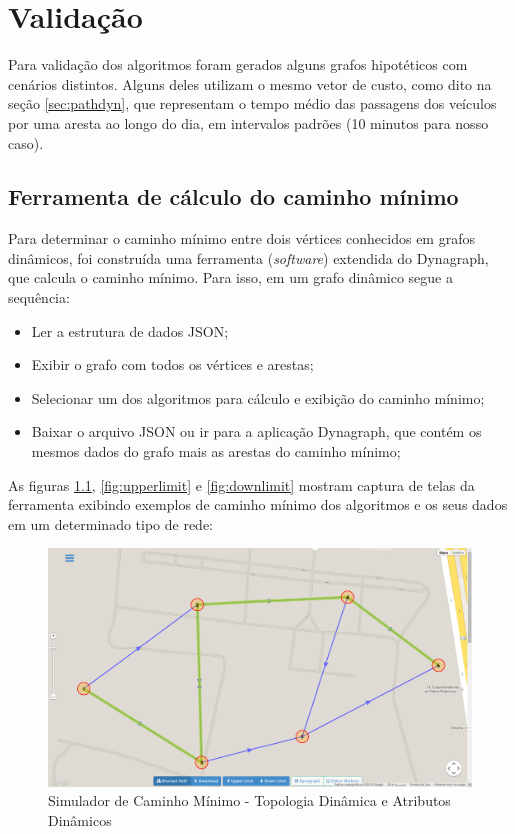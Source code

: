 \chapter{Validação}

Para validação dos algoritmos foram gerados alguns grafos hipotéticos com cenários distintos.
Alguns deles utilizam o mesmo vetor de custo, como dito na seção \ref{sec:pathdyn}, que representam
o tempo médio das passagens dos veículos por uma aresta ao longo do dia, em intervalos padrões (10 minutos para nosso caso).

\section{Ferramenta de cálculo do caminho mínimo}
Para determinar o caminho mínimo entre dois vértices conhecidos em grafos dinâmicos, foi construída uma ferramenta (\textit{software})
extendida do Dynagraph, que calcula o caminho mínimo. Para isso, em um grafo dinâmico segue a sequência:
\begin{itemize}
\item Ler a estrutura de dados JSON;
\item Exibir o grafo com todos os vértices e arestas;
\item Selecionar um dos algoritmos para cálculo e exibição do caminho mínimo;
\item Baixar o arquivo JSON ou ir para a aplicação Dynagraph, que contém os mesmos dados do grafo mais as arestas do caminho mínimo;
\end{itemize}

As figuras \ref{fig:shortestpath}, \ref{fig:upperlimit} e \ref{fig:downlimit} mostram captura de telas
da ferramenta exibindo exemplos de caminho mínimo dos algoritmos e os seus dados em um determinado tipo de rede:

\begin{figure}[htbp]
\centering
 \includegraphics[width=.90\textwidth]{chapters/fig/validacao/shortestpath.png}
\caption{Simulador de Caminho Mínimo - Topologia Dinâmica e Atributos Dinâmicos}
\label{fig:shortestpath}
\end{figure}
\FloatBarrier

